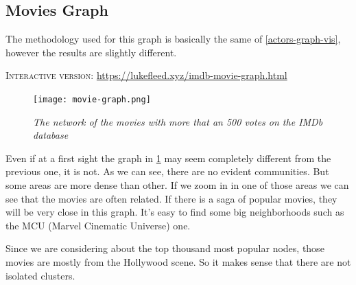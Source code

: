 \subsection{Movies Graph}

The methodology used for this graph is basically the same of \ref{actors-graph-vis}, however the results are slightly different. \s

\textsc{Interactive version}: \url{https://lukefleed.xyz/imdb-movie-graph.html}
\begin{center}
    \s \nd {}
\end{center}

\s

\begin{figure}[H]
    \centering
    \texttt{[image: movie-graph.png]}
    \caption{\emph{The network of the movies with more that an 500 votes on the IMDb database}}
    \label{fig:imdb-m-network}
\end{figure}

Even if at a first sight the graph in \ref{fig:imdb-m-network} may seem completely different from the previous one, it is not. As we can see, there are no evident communities. But some areas are more dense than other. If we zoom in in one of those areas we can see that the movies are often related. If there is a saga of popular movies, they will be very close in this graph. It's easy to find some big neighborhoods such as the MCU (Marvel Cinematic Universe) one. \s

\nd Since we are considering about the top thousand most popular nodes, those movies are mostly from the Hollywood scene. So it makes sense that there are not isolated clusters.
